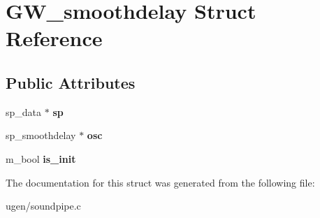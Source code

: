 \hypertarget{structGW__smoothdelay}{}\section{G\+W\+\_\+smoothdelay Struct Reference}
\label{structGW__smoothdelay}
\subsection*{Public Attributes}
\begin{DoxyCompactItemize}
\item 
\hypertarget{structGW__smoothdelay_acad4f16583dcbd9c73d9b3a351571285}{}\label{structGW__smoothdelay_acad4f16583dcbd9c73d9b3a351571285} 
sp\+\_\+data $\ast$ {\bfseries sp}
\item 
\hypertarget{structGW__smoothdelay_ad11f98e80910dbc66560eeba7949f170}{}\label{structGW__smoothdelay_ad11f98e80910dbc66560eeba7949f170} 
sp\+\_\+smoothdelay $\ast$ {\bfseries osc}
\item 
\hypertarget{structGW__smoothdelay_a8102855c653ff61a1adf096c325ffbb3}{}\label{structGW__smoothdelay_a8102855c653ff61a1adf096c325ffbb3} 
m\+\_\+bool {\bfseries is\+\_\+init}
\end{DoxyCompactItemize}


The documentation for this struct was generated from the following file\+:\begin{DoxyCompactItemize}
\item 
ugen/soundpipe.\+c\end{DoxyCompactItemize}
